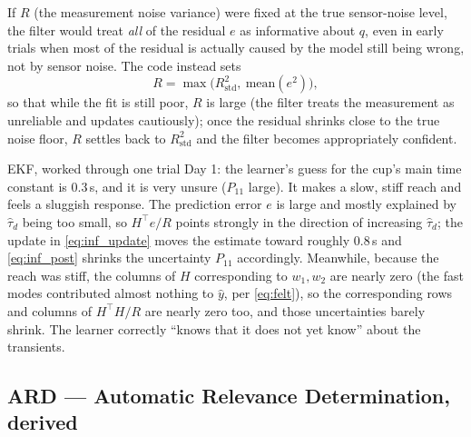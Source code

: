 \documentclass[11pt,a4paper]{article}
\begin{document}
If $R$ (the measurement noise variance) were fixed at the true sensor-noise
level, the filter would treat \emph{all} of the residual $e$ as informative
about $q$, even in early trials when most of the residual is actually caused
by the model still being wrong, not by sensor noise. The code instead sets
\[
R = \max\bigl(R_{\mathrm{std}}^2,\ \mathrm{mean}(e^2)\bigr),
\]
so that while the fit is still poor, $R$ is large (the filter treats the
measurement as unreliable and updates cautiously); once the residual shrinks
close to the true noise floor, $R$ settles back to $R_{\mathrm{std}}^2$ and
the filter becomes appropriately confident.

\begin{examplebox}{EKF, worked through one trial}
Day 1: the learner's guess for the cup's main time constant is 0.3\,s, and it
is very unsure ($P_{11}$ large). It makes a slow, stiff reach and feels a
sluggish response. The prediction error $e$ is large and mostly explained by
$\hat\tau_d$ being too small, so $H^\top e/R$ points strongly in the direction
of increasing $\hat\tau_d$; the update in \eqref{eq:inf_update} moves the
estimate toward roughly 0.8\,s and \eqref{eq:inf_post} shrinks the
uncertainty $P_{11}$ accordingly. Meanwhile, because the reach was stiff, the
columns of $H$ corresponding to $w_1,w_2$ are nearly zero (the fast modes
contributed almost nothing to $\hat y$, per \eqref{eq:felt}), so the
corresponding rows and columns of $H^\top H/R$ are nearly zero too, and those
uncertainties barely shrink. The learner correctly ``knows that it does not
yet know'' about the transients.
\end{examplebox}

\subsection{ARD --- Automatic Relevance Determination, derived}
\label{sec:ard}
\end{document}
